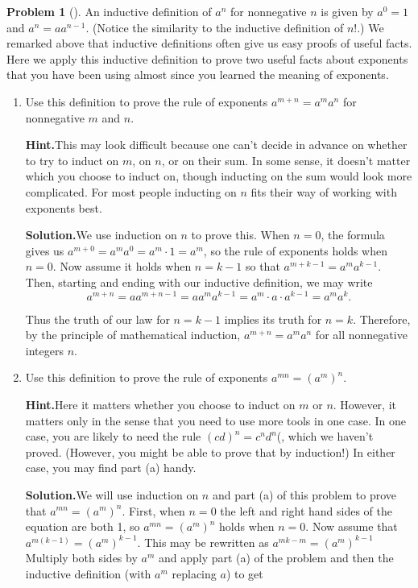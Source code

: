 \documentclass[10pt,]{book}
\theoremstyle{plain}
\theoremstyle{definition}
\newtheorem{activity}[project]{Problem}
\theoremstyle{definition}
\numberwithin{equation}{chapter}
\begin{document}
\begin{activity}[]\label{activity-76}
An inductive definition of \(a^n\) for nonnegative \(n\) is given by \(a^0=1\) and \(a^n=aa^{n-1}\). (Notice the similarity to the inductive definition of \(n!\).) We remarked above that inductive definitions often give us easy proofs of useful facts. Here we apply this inductive definition to prove two useful facts about exponents that you have been using almost since you learned the meaning of exponents.%
\begin{enumerate}[font=\bfseries,label=(\alph*),ref=\alph*]
\item\label{task-71} Use this definition to prove the rule of exponents \(a^{m+n}=a^ma^n\) for nonnegative \(m\) and \(n\).%
\par\medskip\noindent%
\textbf{Hint.}\quad This may look difficult because one can't decide in advance on whether to try to induct on \(m\), on \(n\), or on their sum. In some sense, it doesn't matter which you choose to induct on, though inducting on the sum would look more complicated. For most people inducting on \(n\) fits their way of working with exponents best.%
\par\medskip\noindent%
\textbf{Solution.}\quad We use induction on \(n\) to prove this. When \(n=0\), the formula gives us \(a^{m+0} =a^ma^0=a^m\cdot 1=a^m\), so the rule of exponents holds when \(n=0\). Now assume it holds when \(n=k-1\) so that \(a^{m+k-1}=a^ma^{k-1}\). Then, starting and ending with our inductive definition, we may write%
\begin{equation*}
a^{m+n}=aa^{m+n-1}=aa^ma^{k-1}=a^m\cdot a\cdot a^{k-1}=a^ma^k.
\end{equation*}
%
\par
Thus the truth of our law for \(n=k-1\) implies its truth for \(n=k\). Therefore, by the principle of mathematical induction, \(a^{m+n}=a^ma^n\) for all nonnegative integers \(n\).%
\item\label{task-72} Use this definition to prove the rule of exponents \(a^{mn} =
(a^m)^n\).%
\par\medskip\noindent%
\textbf{Hint.}\quad Here it matters whether you choose to induct on \(m\) or \(n\). However, it matters only in the sense that you need to use more tools in one case. In one case, you are likely to need the rule \((cd)^n=c^n d^n\)(, which we haven't proved. (However, you might be able to prove that by induction!) In either case, you may find part (a) handy.%
\par\medskip\noindent%
\textbf{Solution.}\quad We will use induction on \(n\) and part (a) of this problem to prove that \(a^{mn}=(a^m)^n\). First, when \(n=0\) the left and right hand sides of the equation are both 1, so \(a^{mn}=(a^m)^n\) holds when \(n=0\). Now assume that \(a^{m(k-1)} =(a^m)^{k-1}\). This may be rewritten as \(a^{mk-m}=(a^m)^{k-1}\) Multiply both sides by \(a^m\) and apply part (a) of the problem and then the inductive definition (with \(a^m\) replacing \(a\)) to get%

\end{enumerate}
\end{activity}
\end{document}
